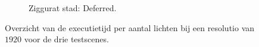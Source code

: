 \begin{figure}[p]
\begin{adjustbox}{minipage=\textwidth, scale=0.6}
  \end{adjustbox} %
  \begin{adjustbox}{minipage=\textwidth, scale=0.6}
    \begin{subfigure}[b]{0.83\textwidth}
      \centering
      \def\svgwidth{\textwidth}
      
      \caption{Ziggurat stad: Deferred.}
      \label{fig:ts-lights-deferred:city}
    \end{subfigure}
  \end{adjustbox}
  \caption{Overzicht van de executietijd per aantal lichten bij een resolutio
           van $1920$ voor de drie testscenes.}
  \label{fig:ts-lights}
\end{figure}

